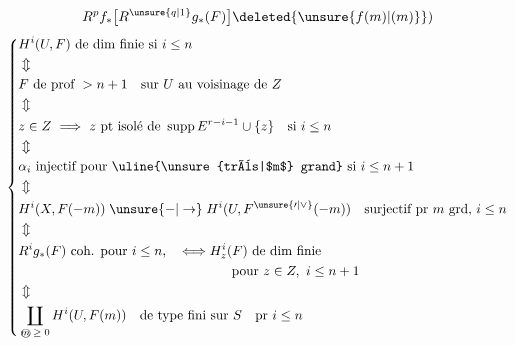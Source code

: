 \[
R^p f_*\bigl[R^{\unsure{q|1}} g_*(F)\bigr]\deleted{\unsure{f(m)|({m})}})
\]
\[
\left\{\begin{aligned}
&H^i(U,F)\text{ de dim finie si }i\leq n\\
&\Updownarrow\\
&F\text{ de prof }>n+1\quad\text{sur }U\text{ au voisinage de }Z\\
&\Updownarrow\\
&z\in Z\ \Longrightarrow\ z\text{ pt isolé de }\operatorname{supp}E^{r-i-1}\cup\{z\}\quad\text{si }i\leq n\\
&\Updownarrow\\
&\alpha_i\text{ injectif pour \uline{\unsure{très|$m$} grand} si }i\leq n+1\\
&\Updownarrow\\
&H^i(X,F(-m))\mathrel{\unsure{-|\to}}H^i(U,F^{\unsure{\prime|\vee}}(-m))\quad\text{surjectif pr }m\text{ grd, }i\leq n\\
&\Updownarrow\\
&R^ig_*(F)\text{ coh. pour }i\leq n,\quad\Longleftrightarrow H^i_z(F)\text{ de dim finie}\\
&\hspace{16em}\text{pour }z\in Z,\ i\leq n+1\\
&\Updownarrow\\
&\coprod_{\text{\textcircled{\scriptsize $m\geq0$}}}H^i(U,F(m))\quad\text{de type fini sur }S\quad\text{pr }i\leq n
\end{aligned}\right.
\]
